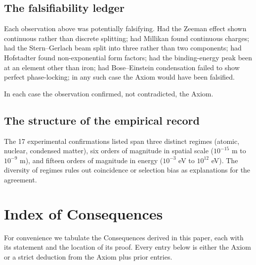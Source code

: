 \documentclass[11pt,twocolumn,a4paper]{article}
\theoremstyle{axiomstyle}
\theoremstyle{conseqstyle}
\theoremstyle{definition}
\theoremstyle{remark}
\begin{document}
\subsection{The falsifiability ledger}

Each observation above was potentially falsifying. Had the Zeeman effect shown continuous rather than discrete splitting; had Millikan found continuous charges; had the Stern--Gerlach beam split into three rather than two components; had Hofstadter found non-exponential form factors; had the binding-energy peak been at an element other than iron; had Bose--Einstein condensation failed to show perfect phase-locking; in any such case the Axiom would have been falsified.

In each case the observation confirmed, not contradicted, the Axiom.

\subsection{The structure of the empirical record}

The 17 experimental confirmations listed span three distinct regimes (atomic, nuclear, condensed matter), six orders of magnitude in spatial scale ($10^{-15}$ m to $10^{-9}$ m), and fifteen orders of magnitude in energy ($10^{-3}$ eV to $10^{12}$ eV). The diversity of regimes rules out coincidence or selection bias as explanations for the agreement.

\section{Index of Consequences}
\label{sec:index}

For convenience we tabulate the Consequences derived in this paper, each with its statement and the location of its proof. Every entry below is either the Axiom or a strict deduction from the Axiom plus prior entries.
\end{document}
